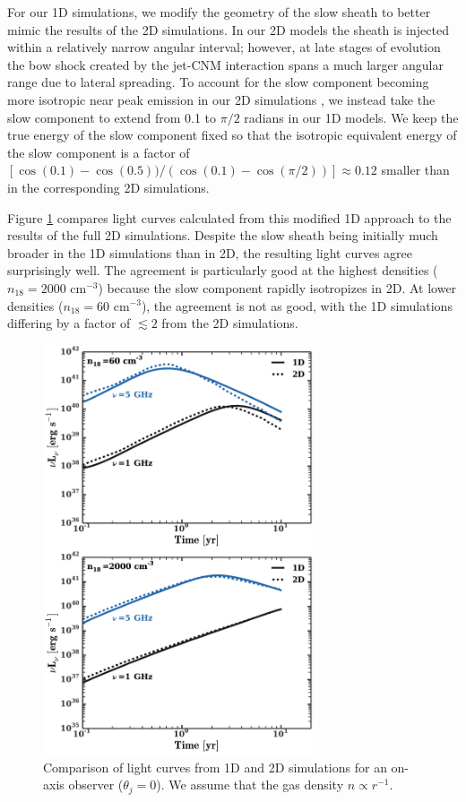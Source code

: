 \documentclass[usenatbib,fleqn]{mnras}
\begin{document}
For our 1D simulations, we modify the geometry of the slow sheath to
better mimic the results of the 2D simulations.  In our 2D models the
sheath is injected within a relatively narrow angular interval;
however, at late stages of evolution the bow shock created by the
jet-CNM interaction spans a much larger angular range due to lateral
spreading.  To account for the slow component becoming more isotropic
near peak emission in our 2D simulations \citep[bottom two panels of
Fig.~8 in][]{Mimica+2015}, we instead take the slow component to
extend from 0.1 to $\pi/2$ radians in our 1D models.  We keep the true
energy of the slow component fixed so that the isotropic equivalent
energy of the slow component is a factor of
$[\cos(0.1)-\cos(0.5))/(\cos(0.1)-\cos(\pi/2))]\approx 0.12$ smaller
than in the corresponding 2D simulations.

Figure \ref{fig:1D2DB} compares light curves calculated from this
modified 1D approach to the results of the full 2D simulations.
Despite the slow sheath being initially much broader in the 1D
simulations than in 2D, the resulting light curves agree surprisingly
well.  The agreement is particularly good at the highest densities
($n_{18}=2000$ cm$^{-3}$) because the slow component rapidly
isotropizes in 2D.  At lower densities ($n_{18}=60$ cm$^{-3}$), the
agreement is not as good, with the 1D simulations differing by a
factor of $\lesssim 2$ from the 2D simulations.


\begin{figure}
\includegraphics[width=8cm]{1d_2d.pdf}
\caption{\label{fig:1D2DB} Comparison of light curves from 1D and 2D
  simulations for an on-axis observer ($\theta_{j} = 0$). We
  assume that the gas density $n\propto r^{-1}$.}
\end{figure}
\end{document}
